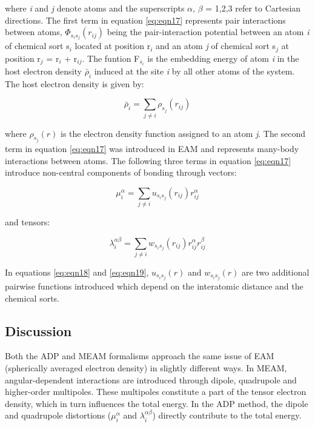 \documentclass[review]{elsarticle}
\begin{document}
where \textit{i} and \textit{j} denote atoms and the superscripts $\alpha$, $\beta$ = 1,2,3 refer to Cartesian directions. The first term in equation \ref{eq:eqn17} represents pair interactions between atoms, $\Phi_{s_{i}s_{j}}(r_{ij})$ being the pair-interaction potential between an atom \textit{i} of chemical sort s$_{i}$ located at position r$_{i}$ and an atom \textit{j} of chemical sort s$_{j}$ at position r$_{j}$ = r$_{i}$ + r$_{ij}$. The funtion F$_{s_{i}}$ is the embedding energy of atom \textit{i} in the host electron density $\bar{\rho}_{i}$ induced at the site \textit{i} by all other atoms of the system. The host electron density is given by:

\begin{equation}
\label{eq:eqn18}
\bar{\rho}_{i} = \sum_{j \neq i} \rho_{s_{j}}(r_{ij}) 
\end{equation}

where $\rho_{s_{j}}(r)$ is the electron density function assigned to an atom \textit{j}. The second term in equation \ref{eq:eqn17} was introduced in EAM and represents many-body interactions between atoms. The following three terms in equation \ref{eq:eqn17} introduce non-central components of bonding through vectors: 

\begin{equation}
\label{eq:eqn19}
\mu_{i}^{\alpha} = \sum_{j \neq i} u_{s_{i}s_{j}}(r_{ij})r_{ij}^{\alpha} 
\end{equation}

and tensors:

\begin{equation}
\label{eq:eqn20}
\lambda_{i}^{\alpha \beta} = \sum_{j \neq i} w_{s_{i}s_{j}}(r_{ij})r_{ij}^{\alpha}r_{ij}^{\beta}
\end{equation}

In equations \ref{eq:eqn18} and \ref{eq:eqn19}, $u_{s_{i}s_{j}}(r)$ and $w_{s_{i}s_{j}}(r)$ are two additional pairwise functions introduced which depend on the interatomic distance and the chemical sorts. 

\subsection{Discussion}
Both the ADP and MEAM formalisms approach the same issue of EAM (spherically averaged electron density) in slightly different ways. In MEAM, angular-dependent interactions are introduced through dipole, quadrupole and higher-order multipoles. These multipoles constitute a part of the tensor electron density, which in turn influences the total energy. In the ADP method, the dipole and quadrupole distortions ($\mu_{i}^{\alpha}$ and $\lambda_{i}^{\alpha \beta}$) directly contribute to the total energy.
\end{document}
